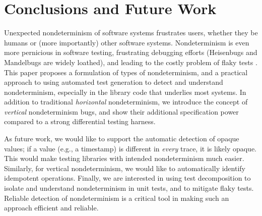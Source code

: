 \section{Conclusions and Future Work}

Unexpected nondeterminism of software systems frustrates users,
whether they be humans or (more importantly) other software systems.
Nondeterminism is even more pernicious in software testing,
frustrating debugging efforts (Heisenbugs \cite{Heisenbug} and
Mandelbugs \cite{GrottkeBugs,FaultTriggers} are widely loathed), and
leading to the costly problem of flaky tests
\cite{miccoflaky,listfieldtestanalysis}.
This paper proposes a formulation of types of nondeterminism, and a
practical approach to using automated test generation to detect and understand
nondeterminism, especially in the library code that underlies most
systems. In addition to traditional \emph{horizontal} nondeterminism, we introduce
the concept of \emph{vertical} nondeterminism bugs, and show their
additional specification power compared to a
strong differential testing harness.  
\begin{comment}
We implemented our approach in the
TSTL automated test generation system for Python, and demonstrated the
simplicity and utility of the approach on real-world examples.
\end{comment}

As future work, we would like to support the automatic detection of opaque
values; if a value (e.g., a timestamp) is different in \emph{every}
trace, it is likely opaque.  This would make
testing libraries with intended nondeterminism much easier. Similarly, for
vertical nondeterminism, we would like to
automatically identify idempotent operations.
Finally, we are interested in using test decomposition
\cite{Composition} to isolate and understand
nondeterminism in unit tests, and to mitigate flaky tests.
Reliable detection of nondeterminism is a critical tool in making such
an approach efficient and reliable.

